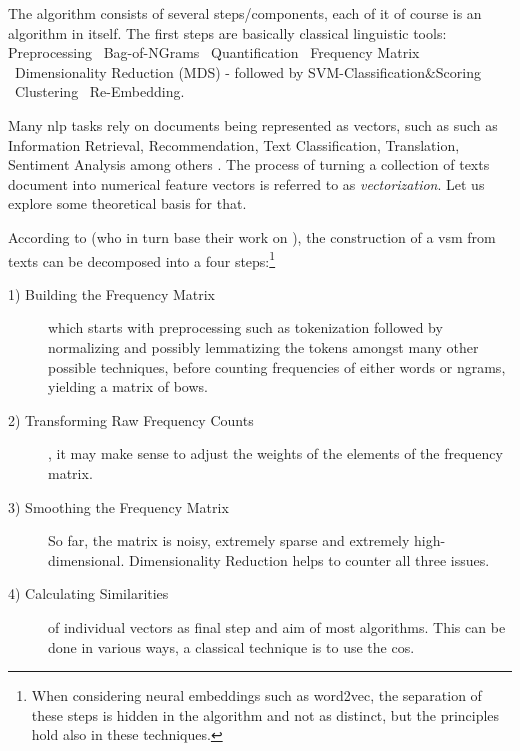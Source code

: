 
The algorithm consists of several steps/components, each of it of course is an algorithm in itself. The first steps are basically classical linguistic tools: Preprocessing \textrightarrow ~Bag-of-NGrams \textrightarrow ~Quantification \textrightarrow ~Frequency Matrix \textrightarrow ~Dimensionality Reduction (MDS) - followed by SVM-Classification\&Scoring \textrightarrow ~Clustering \textrightarrow ~Re-Embedding.

Many \gls{nlp} tasks rely on documents being represented as vectors, such as such as Information Retrieval, Recommendation, Text Classification, Translation, Sentiment Analysis among others \cite{Smith2017,bird2009natural,Devlin2019,Le2014,Mikolov2013a,Turney2010,Guo,Chen2018,Maas2011}. The process of turning a collection of texts document into numerical feature vectors is referred to as \textit{vectorization}. Let us explore some theoretical basis for that.

According to \textcite{Turney2010} (who in turn base their work on \textcite{Lowe}), the construction of a \gls{vsm} from texts can be decomposed into a four steps:\footnote{When considering neural embeddings such as \gls{word2vec}, the separation of these steps is hidden in the algorithm and not as distinct, but the principles hold also in these techniques.}

\begin{description}
    \item[1) Building the Frequency Matrix] which starts with preprocessing such as tokenization followed by normalizing and possibly \gls{lemma}tizing the tokens amongst many other possible techniques, before counting frequencies of either words or \glspl{ngram}, yielding a matrix of \glspl{bow}.
    \item[2) Transforming Raw Frequency Counts]  \cite{Turney2010}, it may make sense to adjust the weights of the elements of the frequency matrix.
    \item[3) Smoothing the Frequency Matrix] So far, the matrix is noisy, extremely sparse and extremely high-dimensional. Dimensionality Reduction helps to counter all three issues.
    \item[4) Calculating Similarities] of individual vectors as final step and aim of most algorithms. This can be done in various ways, a classical technique is to use the \gls{cos}.
\end{description}

